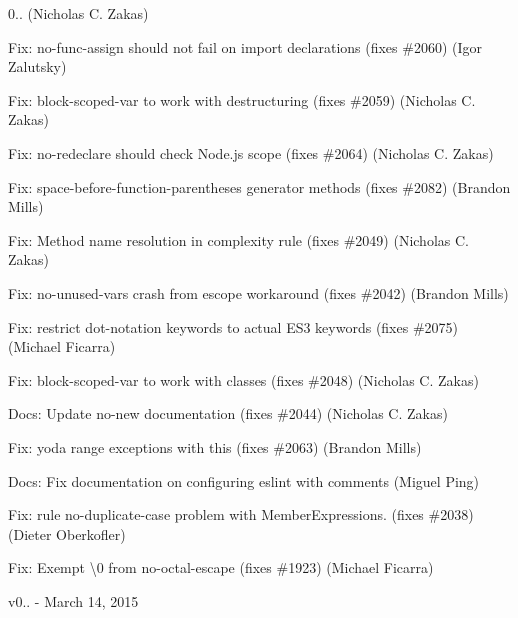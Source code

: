 \begin{DoxyItemize}
\item 0.. (Nicholas C. Zakas)
\item Fix\+: no-\/func-\/assign should not fail on import declarations (fixes \#2060) (Igor Zalutsky)
\item Fix\+: block-\/scoped-\/var to work with destructuring (fixes \#2059) (Nicholas C. Zakas)
\item Fix\+: no-\/redeclare should check Node.\+js scope (fixes \#2064) (Nicholas C. Zakas)
\item Fix\+: space-\/before-\/function-\/parentheses generator methods (fixes \#2082) (Brandon Mills)
\item Fix\+: Method name resolution in complexity rule (fixes \#2049) (Nicholas C. Zakas)
\item Fix\+: no-\/unused-\/vars crash from escope workaround (fixes \#2042) (Brandon Mills)
\item Fix\+: restrict dot-\/notation keywords to actual E\+S3 keywords (fixes \#2075) (Michael Ficarra)
\item Fix\+: block-\/scoped-\/var to work with classes (fixes \#2048) (Nicholas C. Zakas)
\item Docs\+: Update no-\/new documentation (fixes \#2044) (Nicholas C. Zakas)
\item Fix\+: yoda range exceptions with this (fixes \#2063) (Brandon Mills)
\item Docs\+: Fix documentation on configuring eslint with comments (Miguel Ping)
\item Fix\+: rule no-\/duplicate-\/case problem with Member\+Expressions. (fixes \#2038) (Dieter Oberkofler)
\item Fix\+: Exempt \textbackslash{}0 from no-\/octal-\/escape (fixes \#1923) (Michael Ficarra)
\end{DoxyItemize}

v0.. -\/ March 14, 2015


